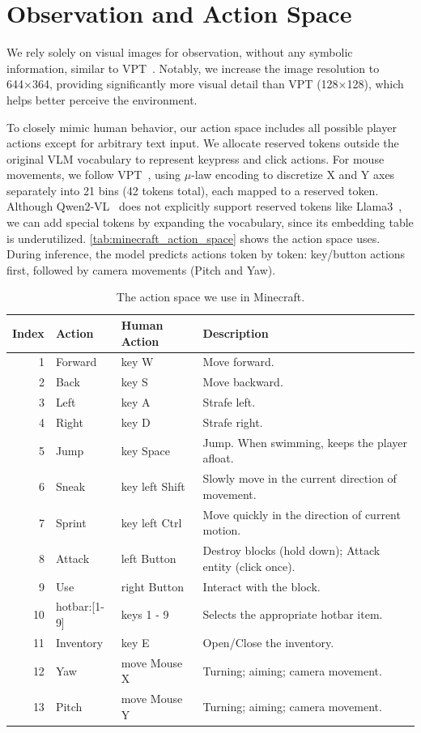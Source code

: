 \section{Observation and Action Space}\label{app:action_space}
We rely solely on visual images for observation, without any symbolic information, similar to VPT~\citep{vpt}. Notably, we increase the image resolution to 644×364, providing significantly more visual detail than VPT (128×128), which helps \model better perceive the environment.

To closely mimic human behavior, our action space includes all possible player actions except for arbitrary text input. We allocate reserved tokens outside the original VLM vocabulary to represent keypress and click actions. For mouse movements, we follow VPT~\citep{vpt}, using $\mu$-law encoding to discretize X and Y axes separately into 21 bins (42 tokens total), each mapped to a reserved token. Although Qwen2-VL~\citep{qwen2vl} does not explicitly support reserved tokens like Llama3~\citep{llama3.2}, we can add special tokens by expanding the vocabulary, since its embedding table is underutilized. \autoref{tab:minecraft_action_space} shows the action space \model uses. During inference, the model predicts actions token by token: key/button actions first, followed by camera movements (Pitch and Yaw).


\begin{table}[htbp] %
\centering %
\caption{The action space we use in Minecraft.} 
\label{tab:minecraft_action_space} 
\begin{tabularx}{\linewidth}{r l l X} 
\toprule
\textbf{Index} & \textbf{Action} & \textbf{Human Action} & \textbf{Description} \\
\midrule
1 & Forward & key W & Move forward. \\
2 & Back & key S & Move backward. \\
3 & Left & key A & Strafe left. \\
4 & Right & key D & Strafe right. \\
5 & Jump & key Space & Jump. When swimming, keeps the player afloat. \\
6 & Sneak & key left Shift & Slowly move in the current direction of movement. \\
7 & Sprint & key left Ctrl & Move quickly in the direction of current motion. \\
8 & Attack & left Button & Destroy blocks (hold down); Attack entity (click once). \\
9 & Use & right Button & Interact with the block. \\
10 & hotbar:[1-9] & keys 1 - 9 & Selects the appropriate hotbar item. \\
11 & Inventory & key E & Open/Close the inventory. \\
12 & Yaw & move Mouse X & Turning; aiming; camera movement. \\
13 & Pitch & move Mouse Y & Turning; aiming; camera movement.  \\
\bottomrule
\end{tabularx}
\end{table}


